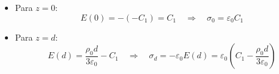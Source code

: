 \documentclass[a4paper,12pt]{article}
\newcommand{\printingbibliography}{%

    \pagestyle{myheadings}
    \markright{}
    \sloppy
    \printbibliography[heading=bibintoc, %
                   title=Refer\^encias %
                  ]
    \fussy%
}
\begin{document}
\begin{flushleft}
\begin{itemize}
  \item Para \( z = 0 \):
  \begin{equation}
  E(0) = -\left( -C_1 \right) = C_1 \quad \Rightarrow \quad \boxed{\sigma_0 = \varepsilon_0 C_1}
  \end{equation}

  \item Para \( z = d \):
  \begin{equation}
  E(d) = \frac{\rho_0 d}{3 \varepsilon_0} - C_1 \quad \Rightarrow \quad 
  \boxed{\sigma_d = -\varepsilon_0 E(d) = \varepsilon_0 \left( C_1 - \frac{\rho_0 d}{3 \varepsilon_0} \right)}
  \end{equation}
\end{itemize}

\end{flushleft}

\end{document}
